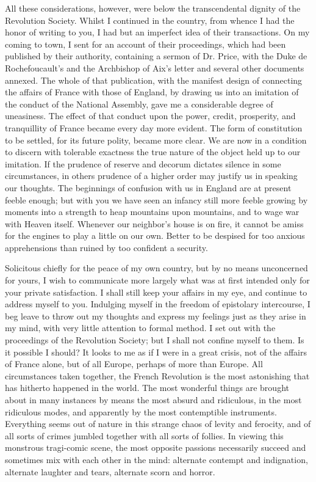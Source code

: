 All these considerations, however, were below the transcendental dignity of the Revolution Society. Whilst I continued in the country, from whence I had the honor of writing to you, I had but an imperfect idea of their transactions. On my coming to town, I sent for an account of their proceedings, which had been published by their authority, containing a sermon of Dr. Price, with the Duke de Rochefoucault's and the Archbishop of Aix's letter and several other documents annexed. The whole of that publication, with the manifest design of connecting the affairs of France with those of England, by drawing us into an imitation of the conduct of the National Assembly, gave me a considerable degree of uneasiness. The effect of that conduct upon the power, credit, prosperity, and tranquillity of France became every day more evident. The form of constitution to be settled, for its future polity, became more clear. We are now in a condition to discern with tolerable exactness the true nature of the object held up to our imitation. If the prudence of reserve and decorum dictates silence in some circumstances, in others prudence of a higher order may justify us in speaking our thoughts. The beginnings of confusion with us in England are at present feeble enough; but with you we have seen an infancy still more feeble growing by moments into a strength to heap mountains upon mountains, and to wage war with Heaven itself. Whenever our neighbor's house is on fire, it cannot be amiss for the engines to play a little on our own. Better to be despised for too anxious apprehensions than ruined by too confident a security.

Solicitous chiefly for the peace of my own country, but by no means unconcerned for yours, I wish to communicate more largely what was at first intended only for your private satisfaction. I shall still keep your affairs in my eye, and continue to address myself to you. Indulging myself in the freedom of epistolary intercourse, I beg leave to throw out my thoughts and express my feelings just as they arise in my mind, with very little attention to formal method. I set out with the proceedings of the Revolution Society; but I shall not confine myself to them. Is it possible I should? It looks to me as if I were in a great crisis, not of the affairs of France alone, but of all Europe, perhaps of more than Europe. All circumstances taken together, the French Revolution is the most astonishing that has hitherto happened in the world. The most wonderful things are brought about in many instances by means the most absurd and ridiculous, in the most ridiculous modes, and apparently by the most contemptible instruments. Everything seems out of nature in this strange chaos of levity and ferocity, and of all sorts of crimes jumbled together with all sorts of follies. In viewing this monstrous tragi-comic scene, the most opposite passions necessarily succeed and sometimes mix with each other in the mind: alternate contempt and indignation, alternate laughter and tears, alternate scorn and horror.

